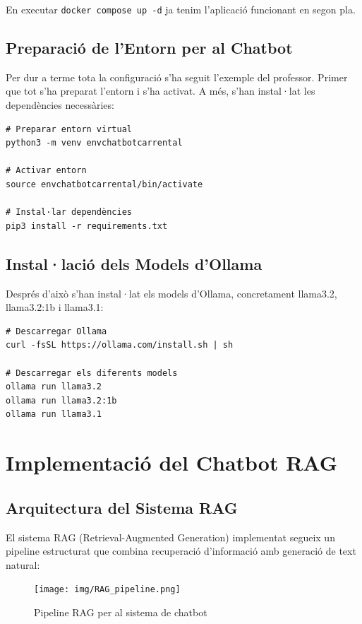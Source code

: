 \documentclass[12pt,a4paper]{article}
\begin{document}
En executar \texttt{docker compose up -d} ja tenim l'aplicació funcionant en segon pla.

\subsection{Preparació de l'Entorn per al Chatbot}

Per dur a terme tota la configuració s'ha seguit l'exemple del professor. Primer que tot s'ha preparat l'entorn i s'ha activat. A més, s'han instal·lat les dependències necessàries:

\begin{lstlisting}[style=shellstyle,caption=Configuració de l'entorn Python]
# Preparar entorn virtual
python3 -m venv envchatbotcarrental

# Activar entorn
source envchatbotcarrental/bin/activate

# Instal·lar dependències
pip3 install -r requirements.txt
\end{lstlisting}

\subsection{Instal·lació dels Models d'Ollama}

Després d'això s'han instal·lat els models d'Ollama, concretament llama3.2, llama3.2:1b i llama3.1:

\begin{lstlisting}[style=shellstyle,caption=Instal·lació d'Ollama i models]
# Descarregar Ollama
curl -fsSL https://ollama.com/install.sh | sh

# Descarregar els diferents models
ollama run llama3.2
ollama run llama3.2:1b
ollama run llama3.1
\end{lstlisting}

\newpage
\section{Implementació del Chatbot RAG}

\subsection{Arquitectura del Sistema RAG}

El sistema RAG (Retrieval-Augmented Generation) implementat segueix un pipeline estructurat que combina recuperació d'informació amb generació de text natural:

\begin{figure}[H]
\centering
\texttt{[image: img/RAG\_pipeline.png]}
\caption{Pipeline RAG per al sistema de chatbot}
\end{figure}
\end{document}
